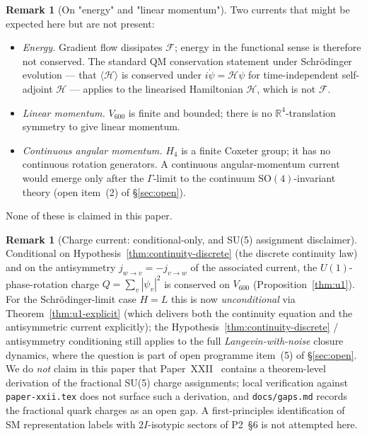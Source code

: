 \documentclass[11pt]{article}
\theoremstyle{definition}
\newtheorem{remark}[theorem]{Remark}
\newcommand{\R}{\mathbb{R}}
\newcommand{\Fcal}{\mathcal{F}}
\newcommand{\Hcal}{\mathcal{H}}
\begin{document}
\begin{remark}[On "energy" and "linear momentum"]\label{rem:no-energy-momentum}
Two currents that might be expected here but are not present:
\begin{itemize}
    \item \emph{Energy.} Gradient flow dissipates $\Fcal$; energy in the functional sense is therefore not conserved. The standard QM conservation statement under Schr\"{o}dinger evolution --- that $\langle \Hcal\rangle$ is conserved under $i\dot\psi = \Hcal\psi$ for time-independent self-adjoint $\Hcal$ --- applies to the linearised Hamiltonian $\Hcal$, which is not $\Fcal$.
    \item \emph{Linear momentum.} $V_{600}$ is finite and bounded; there is no $\R^4$-translation symmetry to give linear momentum.
    \item \emph{Continuous angular momentum.} $H_4$ is a finite Coxeter group; it has no continuous rotation generators. A continuous angular-momentum current would emerge only after the $\Gamma$-limit to the continuum $\mathrm{SO}(4)$-invariant theory (open item~(2) of \S\ref{sec:open}).
\end{itemize}
None of these is claimed in this paper.
\end{remark}

\begin{remark}[Charge current: conditional-only, and SU(5) assignment disclaimer]\label{rem:su5}
Conditional on Hypothesis~\ref{thm:continuity-discrete} (the discrete continuity law) and on the antisymmetry $j_{w \to v} = -j_{v \to w}$ of the associated current, the $U(1)$-phase-rotation charge $Q = \sum_v |\psi_v|^2$ is conserved on $V_{600}$ (Proposition~\ref{thm:u1}). For the Schr\"{o}dinger-limit case $H = L$ this is now \emph{unconditional} via Theorem~\ref{thm:u1-explicit} (which delivers both the continuity equation and the antisymmetric current explicitly); the Hypothesis~\ref{thm:continuity-discrete} / antisymmetry conditioning still applies to the full \emph{Langevin-with-noise} closure dynamics, where the question is part of open programme item~(5) of \S\ref{sec:open}. We do \emph{not} claim in this paper that Paper~XXII~\citep{SmartXXII} contains a theorem-level derivation of the fractional SU(5) charge assignments; local verification against \texttt{paper-xxii.tex} does not surface such a derivation, and \texttt{docs/gaps.md} records the fractional quark charges as an open gap. A first-principles identification of SM representation labels with $2I$-isotypic sectors of P2~\S 6 is not attempted here.
\end{remark}
\end{document}

